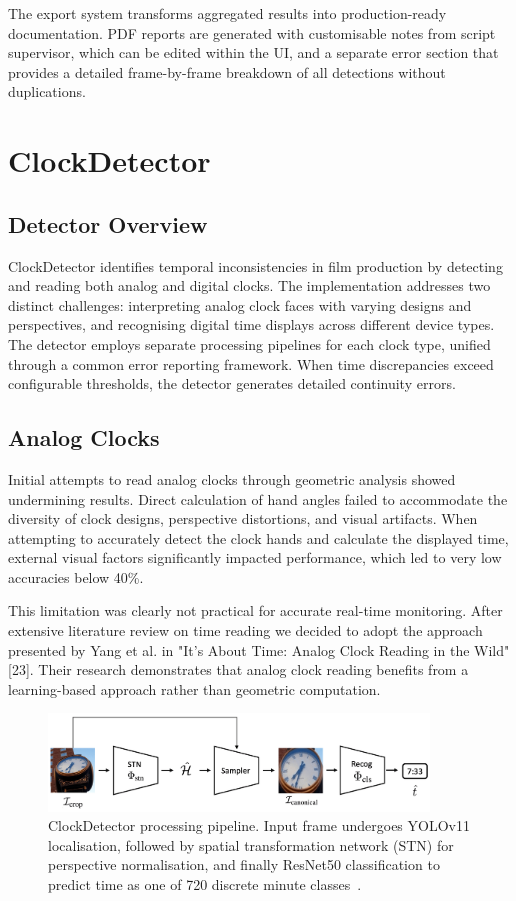The export system transforms aggregated results into production-ready documentation. PDF reports are generated with customisable notes from script supervisor, which can be edited within the UI, and a separate error section that provides a detailed frame-by-frame breakdown of all detections without duplications.

\section{ClockDetector}

\subsection{Detector Overview}
ClockDetector identifies temporal inconsistencies in film production by detecting and reading both analog and digital clocks. The implementation addresses two distinct challenges: interpreting analog clock faces with varying designs and perspectives, and recognising digital time displays across different device types. The detector employs separate processing pipelines for each clock type, unified through a common error reporting framework. When time discrepancies exceed configurable thresholds, the detector generates detailed continuity errors. 

\subsection{Analog Clocks}
Initial attempts to read analog clocks through geometric analysis showed undermining results. Direct calculation of hand angles failed to accommodate the diversity of clock designs, perspective distortions, and visual artifacts. When attempting to accurately detect the clock hands and calculate the displayed time, external visual factors significantly impacted performance, which led to very low accuracies below 40\%.

This limitation was clearly not practical for accurate real-time monitoring. After extensive literature review on time reading we decided to adopt the approach presented by Yang et al. in "It's About Time: Analog Clock Reading in the Wild" [23]. Their research demonstrates that analog clock reading benefits from a learning-based approach rather than geometric computation.

\begin{figure}[h]
\centering
\includegraphics[width=0.9\textwidth]{figures/ArchitectureClock.png}
\caption{ClockDetector processing pipeline. Input frame undergoes YOLOv11 localisation, followed by spatial transformation network (STN) for perspective normalisation, and finally ResNet50 classification to predict time as one of 720 discrete minute classes~\cite{yang2024}.}
\label{fig:clock-pipeline}
\end{figure}

